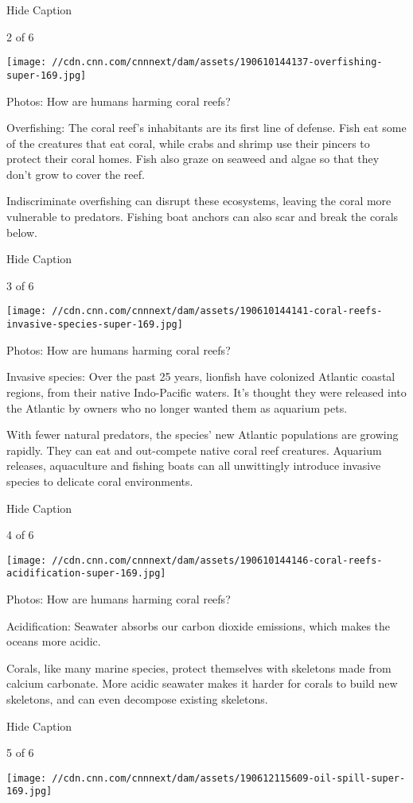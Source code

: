 Hide Caption

2 of 6

\texttt{[image: //cdn.cnn.com/cnnnext/dam/assets/190610144137-overfishing-super-169.jpg]}

Photos: How are humans harming coral reefs?

Overfishing: The coral reef's inhabitants are its first line of defense.
Fish eat some of the creatures that eat coral, while crabs and shrimp
use their pincers to protect their coral homes. Fish also graze on
seaweed and algae so that they don't grow to cover the reef.

Indiscriminate overfishing can disrupt these ecosystems, leaving the
coral more vulnerable to predators. Fishing boat anchors can also scar
and break the corals below.

Hide Caption

3 of 6

\texttt{[image: //cdn.cnn.com/cnnnext/dam/assets/190610144141-coral-reefs-invasive-species-super-169.jpg]}

Photos: How are humans harming coral reefs?

Invasive species: Over the past 25 years, lionfish have colonized
Atlantic coastal regions, from their native Indo-Pacific waters. It's
thought they were released into the Atlantic by owners who no longer
wanted them as aquarium pets.

With fewer natural predators, the species' new Atlantic populations are
growing rapidly. They can eat and out-compete native coral reef
creatures. Aquarium releases, aquaculture and fishing boats can all
unwittingly introduce invasive species to delicate coral environments.

Hide Caption

4 of 6

\texttt{[image: //cdn.cnn.com/cnnnext/dam/assets/190610144146-coral-reefs-acidification-super-169.jpg]}

Photos: How are humans harming coral reefs?

Acidification: Seawater absorbs our carbon dioxide emissions, which
makes the oceans more acidic.

Corals, like many marine species, protect themselves with skeletons made
from calcium carbonate. More acidic seawater makes it harder for corals
to build new skeletons, and can even decompose existing skeletons.

Hide Caption

5 of 6

\texttt{[image: //cdn.cnn.com/cnnnext/dam/assets/190612115609-oil-spill-super-169.jpg]}

